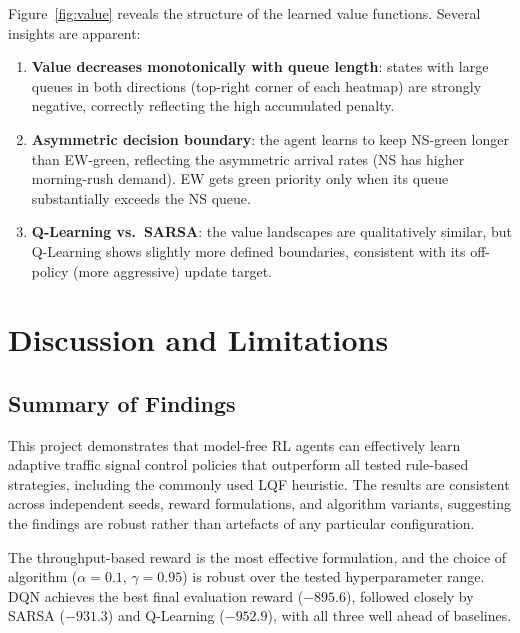 \documentclass[12pt]{article}
\begin{document}
Figure~\ref{fig:value} reveals the structure of the learned value functions. Several
insights are apparent:
\begin{enumerate}[noitemsep]
    \item \textbf{Value decreases monotonically with queue length}: states with large
          queues in both directions (top-right corner of each heatmap) are strongly
          negative, correctly reflecting the high accumulated penalty.
    \item \textbf{Asymmetric decision boundary}: the agent learns to keep NS-green
          longer than EW-green, reflecting the asymmetric arrival rates (NS has
          higher morning-rush demand). EW gets green priority only when its queue
          substantially exceeds the NS queue.
    \item \textbf{Q-Learning vs.\ SARSA}: the value landscapes are qualitatively
          similar, but Q-Learning shows slightly more defined boundaries, consistent
          with its off-policy (more aggressive) update target.
\end{enumerate}

\section{Discussion and Limitations}

\subsection{Summary of Findings}
This project demonstrates that model-free RL agents can effectively learn adaptive
traffic signal control policies that outperform all tested rule-based strategies,
including the commonly used LQF heuristic. The results are consistent across
independent seeds, reward formulations, and algorithm variants, suggesting the findings
are robust rather than artefacts of any particular configuration.

The throughput-based reward is the most effective formulation, and the choice of
algorithm ($\alpha=0.1$, $\gamma=0.95$) is robust over the tested hyperparameter
range. DQN achieves the best final evaluation reward ($-895.6$), followed closely
by SARSA ($-931.3$) and Q-Learning ($-952.9$), with all three well ahead of baselines.
\end{document}
